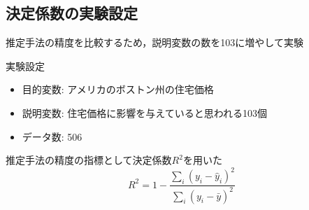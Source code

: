 \documentclass[dvipdfmx, 10pt]{beamer}
\begin{document}
\subsection{決定係数の実験設定}
\begin{frame}{\insertsubsection}
    推定手法の精度を比較するため，説明変数の数を103に増やして実験
    \begin{block}{実験設定}
        \begin{itemize}
                \item 目的変数: アメリカのボストン州の住宅価格
                \item 説明変数: 住宅価格に影響を与えていると思われる103個
                \item データ数: 506
        \end{itemize}
    \end{block}
    推定手法の精度の指標として決定係数$R^2$を用いた
    \begin{equation}
    	R^2 = 1 - \frac{\sum_{i}^{}(y_i - \hat{y}_i)^2}{\sum_{i}^{}(y_i - \bar{y})^2}
    \end{equation}
\end{frame}
\end{document}
